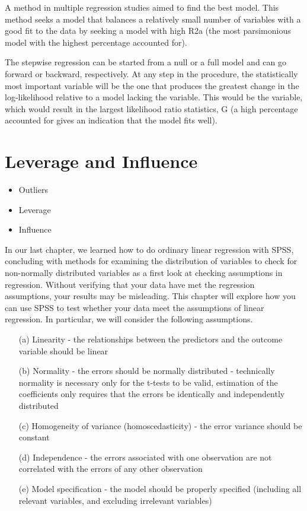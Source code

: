 A method in multiple regression studies aimed to find the best model. This method seeks a model that balances a relatively small number of variables with a good fit to the data by seeking a model with high R2a (the most parsimonious model with the highest percentage accounted for).

The stepwise regression can be started from a null or a full model and can go forward or backward, respectively. At any step in the procedure, the statistically most important variable will be the one that produces the greatest change in the log-likelihood relative to a model lacking the variable. This would be the variable, which would result in the largest likelihood ratio statistics, G (a high percentage accounted for gives an indication that the model fits well).


\section{Leverage and Influence}
\begin{itemize}
\item Outliers
\item Leverage
\item Influence
\end{itemize}

In our last chapter, we learned how to do ordinary linear regression with SPSS, concluding with methods for examining the distribution of variables to check for non-normally distributed variables as a first look at checking assumptions in regression.  Without verifying that your data have met the regression assumptions, your results may be misleading.  This chapter will explore how you can use SPSS to test whether your data meet the assumptions of linear regression.  In particular, we will consider the following assumptions.

\begin{itemize}

\item[(a)] Linearity - the relationships between the predictors and the outcome variable should be linear
\item[(b)]Normality - the errors should be normally distributed - technically normality is necessary only for the t-tests to be valid, estimation of the coefficients only requires that the errors be identically and independently distributed
\item[(c)]Homogeneity of variance (homoscedasticity) - the error variance should be constant
\item[(d)]Independence - the errors associated with one observation are not correlated with the errors of any other observation
\item[(e)]Model specification - the model should be properly specified (including all relevant variables, and excluding irrelevant variables)
\end{itemize}

